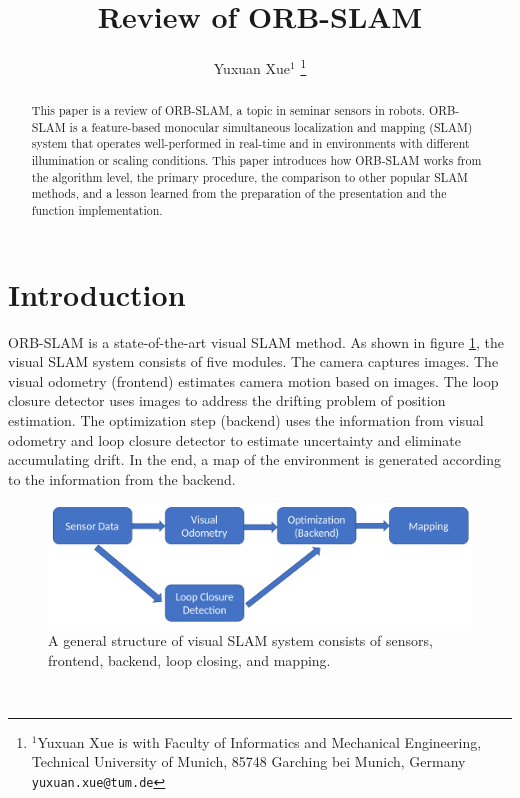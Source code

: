 \documentclass[letterpaper, 10 pt, conference]{ieeeconf}  %
\title{\LARGE \bf
Review of ORB-SLAM
}
\author{Yuxuan Xue$^{1}$%
\thanks{$^{1}$Yuxuan Xue is with Faculty of Informatics and Mechanical Engineering,
        Technical University of Munich, 85748 Garching bei Munich, Germany
        {\tt\small yuxuan.xue@tum.de}}%
}
\begin{document}
\maketitle
\thispagestyle{empty}
\pagestyle{empty}


\begin{abstract}

This paper is a review of ORB-SLAM, a topic in seminar sensors in robots. ORB-SLAM is a feature-based monocular simultaneous localization and mapping (SLAM) system that operates well-performed in real-time and in environments with different illumination or scaling conditions. This paper introduces how ORB-SLAM works from the algorithm level, the primary procedure, the comparison to other popular SLAM methods, and a lesson learned from the preparation of the presentation and the function implementation.

\end{abstract}


\section{Introduction}
\label{section_introduction}

ORB-SLAM is a state-of-the-art visual SLAM method. As shown in figure \ref{main_structure}, the visual SLAM system consists of five modules. The camera captures images. The visual odometry (frontend) estimates camera motion based on images. The loop closure detector uses images to address the drifting problem of position estimation. The optimization step (backend) uses the information from visual odometry and loop closure detector to estimate uncertainty and eliminate accumulating drift. In the end, a map of the environment is generated according to the information from the backend.
%
\begin{figure}[!htbp]%
\centering
\includegraphics[scale=0.175]{./images/Main_structure}
\caption{A general structure of visual SLAM system consists of sensors, frontend, backend, loop closing, and mapping.}
\label{main_structure}
\end{figure}
%
\\
\end{document}
